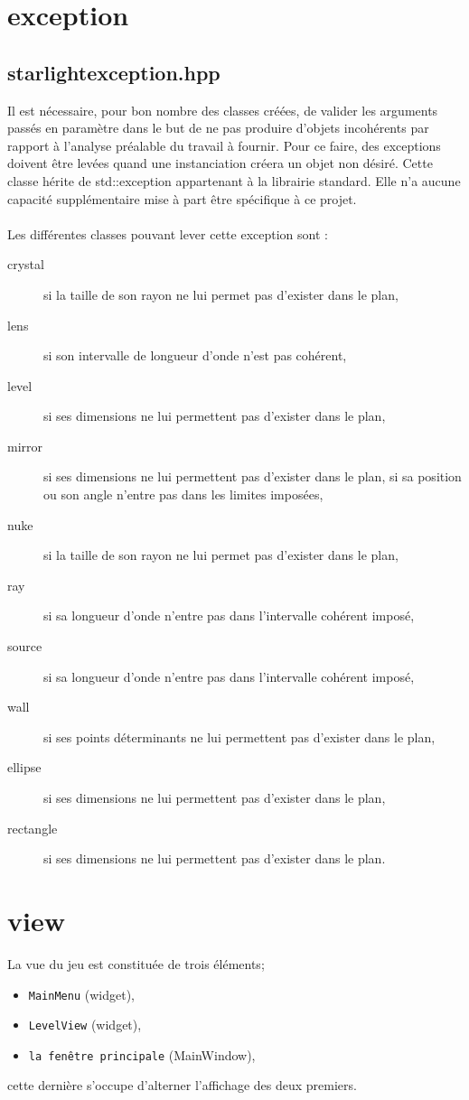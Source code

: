 \documentclass[a4paper,11pt]{report}
\begin{document}
\section[L'exception]{exception}
\subsection[Exception Starlight]{starlightexception.hpp}
Il est nécessaire, pour bon nombre des classes créées, de valider les arguments passés en
paramètre dans le but de ne pas produire d'objets incohérents par rapport à
l'analyse préalable du travail à fournir. Pour ce faire, des exceptions doivent
être levées quand une instanciation créera un objet non désiré. 
Cette classe hérite de std::exception appartenant à la librairie standard. Elle n'a aucune
capacité supplémentaire mise à part être spécifique à ce projet. \\ \\

Les différentes classes pouvant lever cette exception sont :
\begin{description}
	\item[crystal] si la taille de son rayon ne lui permet pas d'exister dans le
		plan,
	\item[lens] si son intervalle de longueur d'onde n'est pas cohérent,
	\item[level] si ses dimensions ne lui permettent pas d'exister dans le plan,
	\item[mirror] si ses dimensions ne lui permettent pas d'exister dans le
		plan, si sa position ou son angle n'entre pas dans les limites imposées,
	\item[nuke] si la taille de son rayon ne lui permet pas d'exister dans le
		plan,
	\item[ray] si sa longueur d'onde n'entre pas dans l'intervalle cohérent
		imposé,
	\item[source] si sa longueur d'onde n'entre pas dans l'intervalle cohérent
		imposé,
	\item[wall] si ses points déterminants ne lui permettent pas d'exister dans
		le plan,
	\item[ellipse] si ses dimensions ne lui permettent pas d'exister dans le
		plan,
	\item[rectangle] si ses dimensions ne lui permettent pas d'exister dans le
		plan.
\end{description}
\newpage
\section[Les objets visuels]{view}
La vue du jeu est constituée de trois éléments;
\begin{itemize}
	\item \texttt{MainMenu} (widget),
	\item \texttt{LevelView} (widget),
	\item \texttt{la fenêtre principale} (MainWindow),
\end{itemize}
cette dernière s'occupe d'alterner l'affichage des deux premiers.
\end{document}
